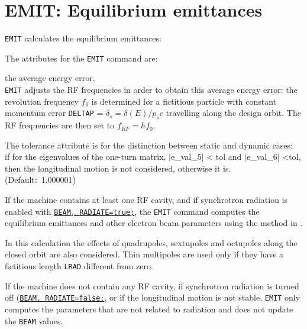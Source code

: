 
\chapter{EMIT: Equilibrium emittances} 
\label{chap:emit}

\texttt{EMIT} calculates the equilibrium emittances: 

\vspace{5mm}

The attributes for the \texttt{EMIT} command are: 

\begin{madlist}
   the average energy error. \\
  {\tt EMIT} adjusts the RF frequencies in order to obtain this
  average energy error: the revolution frequency $f_0$
  is determined for a fictitious particle with constant momentum error  
  {\tt DELTAP} = $\delta_s = \delta(E) / p_s c$ travelling along the design
  orbit. The RF frequencies are then set to   
  $f_{RF} = h f_0$. 

   The tolerance attribute is for the distinction between
  static and dynamic cases: \\
  if for the eigenvalues of the one-turn matrix, $|$e\_val\_5$|$ \textless
  tol and $|$e\_val\_6$|$ \textless tol, then the longitudinal motion is
  not considered, otherwise it is. \\
  (Default:~1.000001)  
\end{madlist}


If the machine contains at least one RF cavity, and if synchrotron
radiation is enabled with \hyperref[sec:beam]{\tt BEAM, RADIATE=true;}, the
{\tt EMIT} command computes the equilibrium emittances and other
electron beam parameters using the method in \cite{chao1979}.

In this calculation the effects of quadrupoles, sextupoles and
octupoles along the closed orbit are also considered. Thin multipoles are
used only if they have a fictitious length {\tt LRAD} different from zero.  

If the machine does not contain any RF cavity, if synchrotron radiation is
turned off (\hyperref[sec:beam]{\tt BEAM, RADIATE=false;}, or if the longitudinal
motion is not stable, {\tt EMIT} only computes the parameters that
are not related to radiation and does not update the {\tt BEAM} values.

